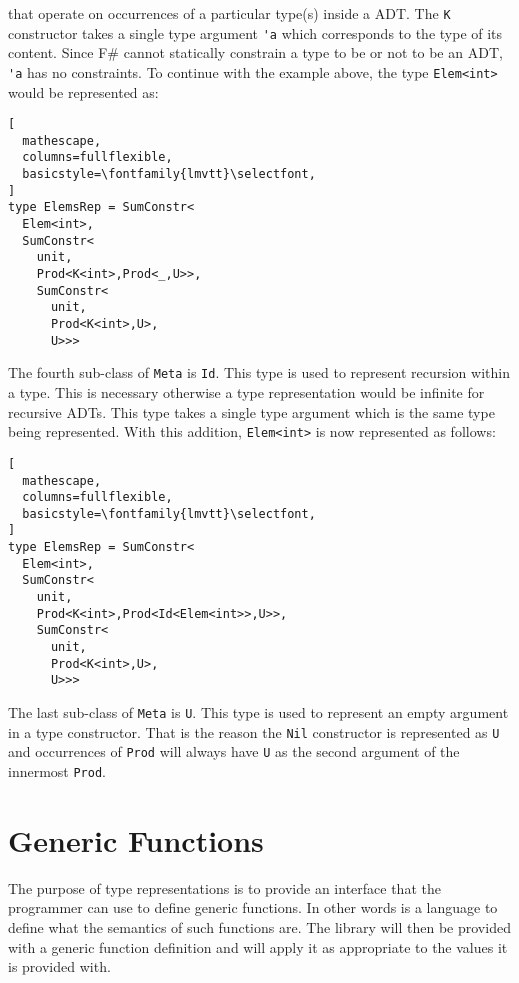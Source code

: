 \documentclass{sigplanconf}
\begin{document}
that operate on occurrences of a particular type(s) inside a ADT. The
\verb+K+ constructor takes a single type argument \verb+'a+ which
corresponds to the type of its content. Since F\# cannot statically
constrain a type to be or not to be an ADT, \verb+'a+ has no
constraints. To continue with the example above, the type
\verb+Elem<int>+ would be represented as:
\begin{lstlisting}[
  mathescape,
  columns=fullflexible,
  basicstyle=\fontfamily{lmvtt}\selectfont,
]
type ElemsRep = SumConstr<
  Elem<int>,
  SumConstr<
    unit,
    Prod<K<int>,Prod<_,U>>,
    SumConstr<
      unit,
      Prod<K<int>,U>,
      U>>>
\end{lstlisting}
The fourth sub-class of \verb+Meta+ is \verb+Id+. This type is used to
represent recursion within a type. This is necessary otherwise a type
representation would be infinite for recursive ADTs. This type takes a
single type argument which is the same type being
represented. With this addition, \verb+Elem<int>+ is now represented
as follows:
\begin{lstlisting}[
  mathescape,
  columns=fullflexible,
  basicstyle=\fontfamily{lmvtt}\selectfont,
]
type ElemsRep = SumConstr<
  Elem<int>,
  SumConstr<
    unit,
    Prod<K<int>,Prod<Id<Elem<int>>,U>>,
    SumConstr<
      unit,
      Prod<K<int>,U>,
      U>>>
\end{lstlisting}
The last sub-class of \verb+Meta+ is \verb+U+. This type is used to
represent an empty argument in a type constructor. That is the reason
the \verb+Nil+ constructor is represented as \verb+U+ and occurrences
of \verb+Prod+ will always have \verb+U+ as the second argument of the
innermost \verb+Prod+.
\section{Generic Functions}
The purpose of type representations is to provide an interface that
the programmer can use to define generic functions. In other words is
a language to define what the semantics of such functions are. The
library will then be provided with a generic function definition and
will apply it as appropriate to the values it is provided with.
\end{document}

